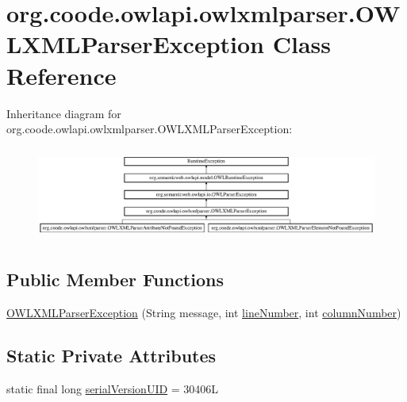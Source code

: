 \hypertarget{classorg_1_1coode_1_1owlapi_1_1owlxmlparser_1_1_o_w_l_x_m_l_parser_exception}{\section{org.\-coode.\-owlapi.\-owlxmlparser.\-O\-W\-L\-X\-M\-L\-Parser\-Exception Class Reference}
\label{classorg_1_1coode_1_1owlapi_1_1owlxmlparser_1_1_o_w_l_x_m_l_parser_exception}
}
Inheritance diagram for org.\-coode.\-owlapi.\-owlxmlparser.\-O\-W\-L\-X\-M\-L\-Parser\-Exception\-:\begin{figure}[H]
\begin{center}
\leavevmode
\includegraphics[height=3.111111cm]{classorg_1_1coode_1_1owlapi_1_1owlxmlparser_1_1_o_w_l_x_m_l_parser_exception}
\end{center}
\end{figure}
\subsection*{Public Member Functions}
\begin{DoxyCompactItemize}
\item 
\hyperlink{classorg_1_1coode_1_1owlapi_1_1owlxmlparser_1_1_o_w_l_x_m_l_parser_exception_a97550f6dc66e077f47efb8333206c478}{O\-W\-L\-X\-M\-L\-Parser\-Exception} (String message, int \hyperlink{classorg_1_1semanticweb_1_1owlapi_1_1io_1_1_o_w_l_parser_exception_a5a5d515eefd8c2871627e152d86c03c2}{line\-Number}, int \hyperlink{classorg_1_1semanticweb_1_1owlapi_1_1io_1_1_o_w_l_parser_exception_af0ad50fb6962ba9b17a4e358e1b82d38}{column\-Number})
\end{DoxyCompactItemize}
\subsection*{Static Private Attributes}
\begin{DoxyCompactItemize}
\item 
static final long \hyperlink{classorg_1_1coode_1_1owlapi_1_1owlxmlparser_1_1_o_w_l_x_m_l_parser_exception_a36ae963b70e9c7b4ffe93be65b740458}{serial\-Version\-U\-I\-D} = 30406\-L
\end{DoxyCompactItemize}


